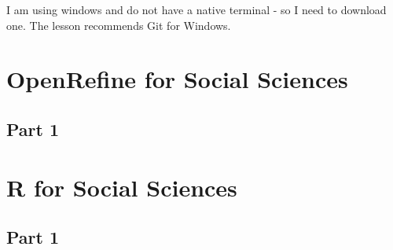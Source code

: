 \documentclass{article}
\begin{document}
I am using windows and do not have a native terminal - so I need to download one. The lesson recommends Git for Windows. 

\section{OpenRefine for Social Sciences}
\subsection{Part 1}


\section{R for Social Sciences}
\subsection{Part 1}
\end{document}
